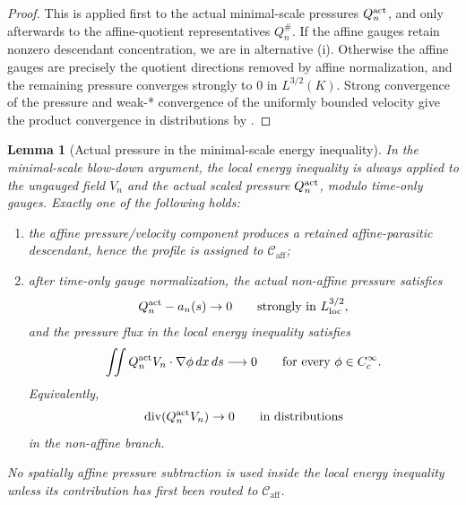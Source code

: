 \documentclass[11pt]{amsart}
\numberwithin{equation}{section}
\theoremstyle{plain}
\newtheorem{lemma}[lemma]{Lemma}
\theoremstyle{definition}
\theoremstyle{remark}
\newcommand{\divergence}{\operatorname{div}}
\newcommand{\Caff}{\mathcal C_{\mathrm{aff}}}
\begin{document}
\begin{proof}
This is  applied first to the
actual minimal-scale pressures \(Q_n^{\rm act}\), and only afterwards to the
affine-quotient representatives \(Q_n^\#\).  If the affine gauges retain nonzero descendant concentration,
we are in alternative \textup{(i)}.  Otherwise the affine gauges are precisely
the quotient directions removed by affine normalization, and the remaining
pressure converges strongly to \(0\) in \(L^{3/2}(K)\).  Strong convergence of
the pressure and weak-* convergence of the uniformly bounded velocity give the
product convergence in distributions by
.
\end{proof}

\begin{lemma}[Actual pressure in the minimal-scale energy inequality]
\label{lem:actual-pressure-minimal-scale-energy}
In the minimal-scale blow-down argument, the local energy inequality is always
applied to the ungauged field \(V_n\) and the actual scaled pressure
\(Q_n^{\rm act}\), modulo time-only gauges.  Exactly one of the following
holds:
\begin{enumerate}[label=\textup{(\roman*)}]
\item the affine pressure/velocity component produces a retained
affine-parasitic descendant, hence the profile is assigned to \(\Caff\);
\item after time-only gauge normalization, the actual non-affine pressure
satisfies
\[
   Q_n^{\rm act}-a_n(s)\to0
   \qquad\text{strongly in }L^{3/2}_{\rm loc},
\]
and the pressure flux in the local energy inequality satisfies
\[
   \iint Q_n^{\rm act}V_n\cdot\nabla\phi\,dx\,ds
   \longrightarrow0
   \qquad\text{for every }\phi\in C_c^\infty.
\]
Equivalently,
\[
   \divergence(Q_n^{\rm act}V_n)\to0
   \qquad\text{in distributions}
\]
in the non-affine branch.
\end{enumerate}
No spatially affine pressure subtraction is used inside the local energy
inequality unless its contribution has first been routed to \(\Caff\).
\end{lemma}
\end{document}

